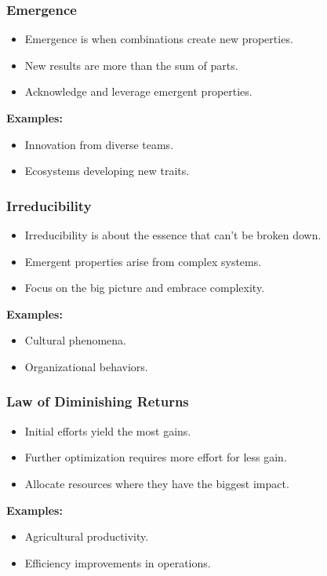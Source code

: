 \begin{frame}[fragile]\frametitle{Emergence}
\begin{itemize}
    \item Emergence is when combinations create new properties.
    \item New results are more than the sum of parts.
    \item Acknowledge and leverage emergent properties.
\end{itemize}
\textbf{Examples:}
\begin{itemize}
    \item Innovation from diverse teams.
    \item Ecosystems developing new traits.
\end{itemize}
\end{frame}

\begin{frame}[fragile]\frametitle{Irreducibility}
\begin{itemize}
    \item Irreducibility is about the essence that can't be broken down.
    \item Emergent properties arise from complex systems.
    \item Focus on the big picture and embrace complexity.
\end{itemize}
\textbf{Examples:}
\begin{itemize}
    \item Cultural phenomena.
    \item Organizational behaviors.
\end{itemize}
\end{frame}

\begin{frame}[fragile]\frametitle{Law of Diminishing Returns}
\begin{itemize}
    \item Initial efforts yield the most gains.
    \item Further optimization requires more effort for less gain.
    \item Allocate resources where they have the biggest impact.
\end{itemize}
\textbf{Examples:}
\begin{itemize}
    \item Agricultural productivity.
    \item Efficiency improvements in operations.
\end{itemize}
\end{frame}

